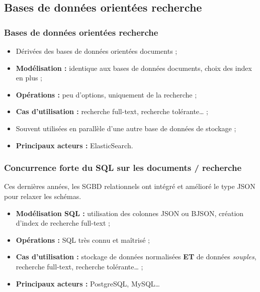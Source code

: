     \subsection{Bases de données orientées recherche}
    \begin{frame}
        \frametitle{Bases de données orientées recherche}

        \begin{itemize}
            \item Dérivées des bases de données orientées documents ;
            \item \textbf{Modélisation :} identique aux bases de données documents, choix des index en plus ;
            \item \textbf{Opérations :} peu d'options, uniquement de la recherche ;
            \item \textbf{Cas d'utilisation :} recherche full-text, recherche tolérante… ;
            \item Souvent utilisées en parallèle d'une autre base de données de stockage ;
            \item \textbf{Principaux acteurs :} ElasticSearch.
        \end{itemize}
    \end{frame}

    \begin{frame}
        \frametitle{Concurrence forte du SQL sur les documents / recherche}

        \vspace{15px}
        Ces dernières années, les SGBD relationnels ont intégré et amélioré le type JSON pour relaxer les schémas.
        \vspace{5px}

        \begin{itemize}
            \item \textbf{Modélisation SQL :} utilisation des colonnes JSON ou BJSON, création d'index de recherche full-text ;
            \item \textbf{Opérations :} SQL très connu et maîtrisé ;
            \item \textbf{Cas d'utilisation :} stockage de données normalisées \textbf{ET} de données \textit{souples}, recherche full-text, recherche tolérante… ;
            \item \textbf{Principaux acteurs :} PostgreSQL, MySQL…
        \end{itemize}
    \end{frame}

